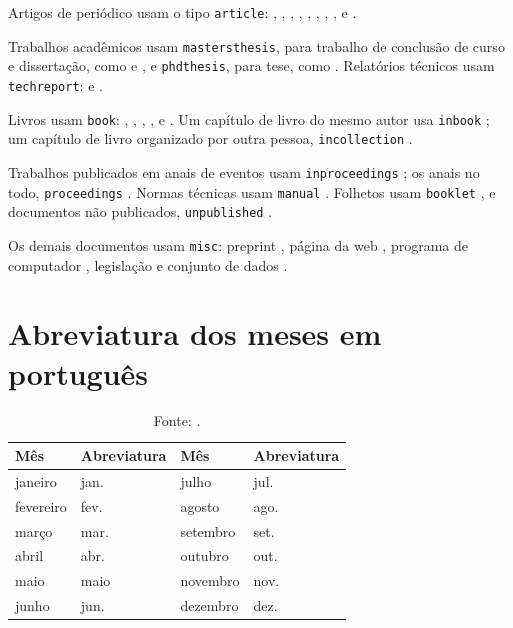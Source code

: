 \documentclass[tese,capa]{texufpel}
\begin{document}
Artigos de periódico usam o tipo \texttt{article}:
\citet{Turing:1937:OCN}, \citet{Turing:1950:CMI}, \citet{Shannon:1948:MTC},
\citet{Dijkstra:1959:NTP}, \citet{Dijkstra:1968:GTS}, \citet{Hoare:1969:ABC},
\citet{Codd:1970:RMD}, \citet{Lamport:1978:TCO},
\citet{Dantzig:1959:TDP} e \citet{Solomon:1987:AVR}.

Trabalhos acadêmicos usam \texttt{mastersthesis}, para trabalho de conclusão
de curso e dissertação, como \citet{Cruz:2015:FCS} e \citet{Shannon:1940:SAR},
e \texttt{phdthesis}, para tese, como \citet{Turing:1938:SLO}. Relatórios
técnicos usam \texttt{techreport}: \citet{vonNeumann:1945:FDR} e
\citet{Postel:1981:IP}.

Livros usam \texttt{book}: \citet{vonNeumann:1966:TSR},
\citet{Knuth:1997:ACP}, \citet{Cormen:2022:IA}, \citet{Brooks:1975:MMM},
\citet{Abelson:1996:SIC} e \citet{Moore:1979:MAI}. Um capítulo de livro do
mesmo autor usa \texttt{inbook} \citep{Knuth:1997:IS}; um capítulo de livro
organizado por outra pessoa, \texttt{incollection}
\citep{vonNeumann:1951:GLT}.

Trabalhos publicados em anais de eventos usam \texttt{inproceedings}
\citep{Cook:1971:CTP}; os anais no todo, \texttt{proceedings}
\citep{ACM:1971:STOC}. Normas técnicas usam \texttt{manual}
\citep{ABNT:2018:NBR6023}. Folhetos usam \texttt{booklet}
\citep{Zorzo:2017:RFC}, e documentos não publicados, \texttt{unpublished}
\citep{Dijkstra:1988:CRT}.

Os demais documentos usam \texttt{misc}: preprint
\citep{Vaswani:2017:AIA}, página da web \citep{ACM:2026:TA}, programa de
computador \citep{Aguiar:2026:TEX}, legislação \citep{Brasil:2015:LBI} e
conjunto de dados \citep{Fisher:1936:IRI}.

\anexos

\chapter{Abreviatura dos meses em português}
\label{anx:meses}

\begin{table}[htbp]
  \caption{Abreviatura dos meses em português}
  \centering
  \begin{tabular}{llll}
    \hline
    Mês & Abreviatura & Mês & Abreviatura \\
    \hline
    janeiro   & jan.  & julho    & jul. \\
    fevereiro & fev.  & agosto   & ago. \\
    março     & mar.  & setembro & set. \\
    abril     & abr.  & outubro  & out. \\
    maio      & maio  & novembro & nov. \\
    junho     & jun.  & dezembro & dez. \\
    \hline
  \end{tabular}
  \caption*{Fonte: \citet{ABNT:2018:NBR6023}.}
\end{table}
\end{document}
